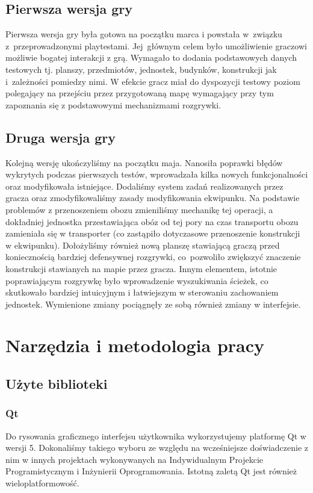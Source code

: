 \documentclass[licencjacka]{pracamgr}
\begin{document}
    \section{Pierwsza wersja gry}
    Pierwsza wersja gry była gotowa na początku marca i powstała w~związku z~przeprowadzonymi playtestami. Jej~głównym
    celem było umożliwienie graczowi możliwie bogatej interakcji z grą. Wymagało to dodania podstawowych
    danych testowych tj. planszy, przedmiotów, jednostek, budynków, konstrukcji jak i~zależności pomiedzy nimi.
    W efekcie gracz miał do dyspozycji testowy poziom polegający na przejściu przez przygotowaną mapę wymagający
    przy tym zapoznania się z podstawowymi mechanizmami rozgrywki.

    \section{Druga wersja gry}
    Kolejną wersję ukończyliśmy na początku maja. Nanosiła poprawki błędów wykrytych podczas pierwszych testów, wprowadzała kilka nowych
    funkcjonalności oraz modyfikowała istniejące. Dodaliśmy system zadań realizowanych przez gracza oraz zmodyfikowaliśmy zasady modyfikowania
    ekwipunku. Na podstawie problemów z przenoszeniem obozu zmieniliśmy mechanikę tej operacji, a dokładniej jednostka przestawiająca
    obóz od tej pory na czas transportu obozu zamieniała się w transporter (co zastąpiło dotyczasowe przenoszenie konstrukcji w ekwipunku).
    Dołożyliśmy również nową planszę stawiającą graczą przed koniecznością bardziej defensywnej rozgrywki,
    co~pozwoliło zwiększyć znaczenie konstrukcji stawianych na mapie przez gracza. Innym elementem, istotnie poprawiającym
    rozgrywkę było wprowadzenie wyszukiwania ścieżek, co skutkowało bardziej intuicyjnym i łatwiejszym w sterowaniu
    zachowaniem jednostek. Wymienione zmiany pociągnęły ze sobą również zmiany w interfejsie.

\chapter{Narzędzia i metodologia pracy}
  \section{Użyte biblioteki}
    \subsection{Qt}
      Do rysowania graficznego interfejsu użytkownika wykorzystujemy platformę Qt\cite{QT} w wersji 5. Dokonaliśmy takiego wyboru
      ze względu na wcześniejsze doświadczenie z nim w innych projektach wykonywanych na Indywidualnym Projekcie Programistycznym
      i Inżynierii Oprogramowania. Istotną zaletą Qt jest również wieloplatformowość.
\end{document}
